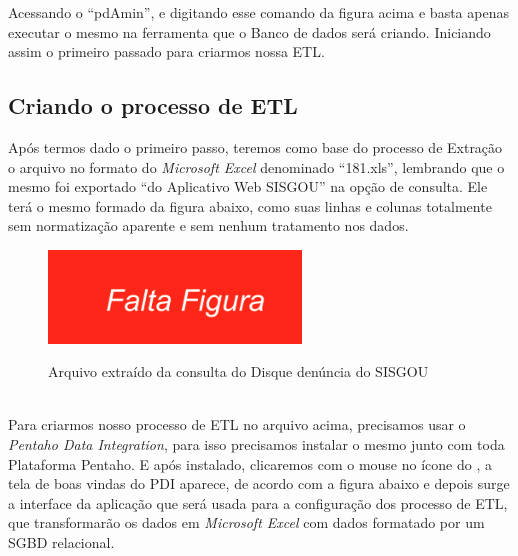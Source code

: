 Acessando o ``pdAmin'', e digitando esse comando da figura acima e basta apenas executar o mesmo na ferramenta que o Banco de dados ser\'{a} criando. Iniciando assim o primeiro passado para criarmos nossa ETL.

\subsection{Criando o processo de ETL}

Ap\'os termos dado o primeiro passo, teremos como base do processo de Extra\c{c}\~{a}o o arquivo no formato do \textit{Microsoft Excel} denominado ``181.xls'', lembrando que o mesmo foi exportado ``do Aplicativo Web SISGOU'' na op\c{c}\~{a}o de consulta. 
Ele ter\'{a} o mesmo formado da figura abaixo, como suas linhas e colunas totalmente sem normatiza\c{c}\~{a}o aparente e sem nenhum tratamento nos dados.


\begin{figure}[H]
	\vspace*{0,2cm}
    \centering
    \caption{Arquivo extra\'{i}do da consulta do Disque denúncia do  SISGOU}
    \includegraphics[width=0.6\textwidth]{./04-figuras/falta-figura.png}
    \label{fig:ilustfigfaltafigura01}
\end{figure}
\vspace*{-0,9cm}
{\raggedright {}} \\

Para criarmos nosso processo de ETL no arquivo acima, precisamos usar o \textit{Pentaho Data Integration}, para isso precisamos instalar o mesmo junto com toda Plataforma Pentaho. E ap\'os instalado,  clicaremos com o mouse no \'{i}cone do , a tela de boas vindas do PDI aparece, de acordo com a figura abaixo e depois surge a interface da aplica\c{c}\~{a}o que ser\'{a} usada para a configura\c{c}\~{a}o dos processo de ETL, que transformar\~{a}o os dados em \textit{Microsoft Excel} com dados formatado por um SGBD relacional.

